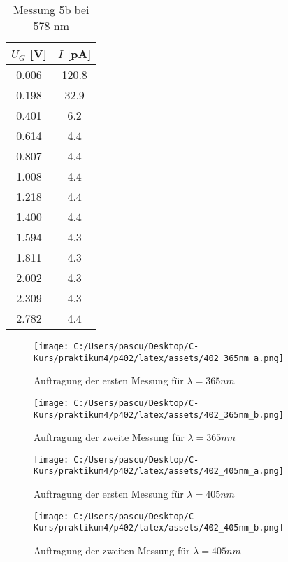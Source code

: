 \documentclass{article}
\begin{document}
\begin{table*}[h!]
  \centering
  \begin{tabular}{|c|c|}
      \hline
      $U_G$ [V] & $I$ [pA] \\
      \hline
      0.006 & 120.8 \\
      0.198 & 32.9  \\
      0.401 & 6.2   \\
      0.614 & 4.4   \\
      0.807 & 4.4   \\
      1.008 & 4.4   \\
      1.218 & 4.4   \\
      1.400 & 4.4   \\
      1.594 & 4.3   \\
      1.811 & 4.3   \\
      2.002 & 4.3   \\
      2.309 & 4.3   \\
      2.782 & 4.4   \\
      \hline
  \end{tabular}
  \caption{Messung 5b bei 578 nm}
  \label{tab:messung5b}
\end{table*}

\begin{figure}[h!]
  \centering
  \texttt{[image: C:/Users/pascu/Desktop/C-Kurs/praktikum4/p402/latex/assets/402\_365nm\_a.png]}
  \caption{Auftragung der ersten Messung für $ \lambda =365nm$}
  \label{fig:wellenlaenge_365nm_a}
\end{figure}

\begin{figure}[h!]
  \centering
  \texttt{[image: C:/Users/pascu/Desktop/C-Kurs/praktikum4/p402/latex/assets/402\_365nm\_b.png]}
  \caption{Auftragung der zweite Messung für $\lambda =365nm$}
  \label{fig:wellenlaenge_365nm_b}
\end{figure}

\begin{figure}[h!]
  \centering
  \texttt{[image: C:/Users/pascu/Desktop/C-Kurs/praktikum4/p402/latex/assets/402\_405nm\_a.png]}
  \caption{Auftragung der ersten Messung für $ \lambda =405nm$}
  \label{fig:wellenlaenge_405nm_a}
\end{figure}

\begin{figure}[h!]
  \centering
  \texttt{[image: C:/Users/pascu/Desktop/C-Kurs/praktikum4/p402/latex/assets/402\_405nm\_b.png]}
  \caption{Auftragung der zweiten Messung für $\lambda =405nm$}
  \label{fig:wellenlaenge_405nm_b}
\end{figure}
\end{document}
